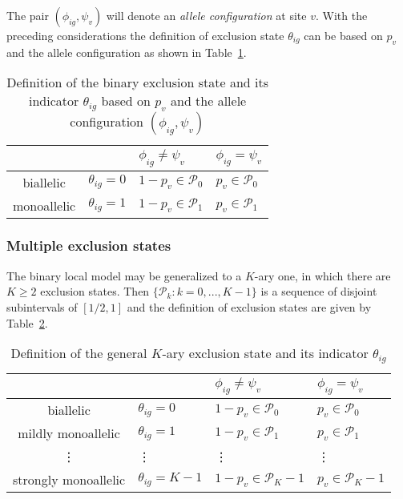 \documentclass[letterpaper]{article}
\begin{document}
The pair \((\phi_{ig},\psi_v)\) will denote an \emph{allele configuration} at
site \(v\).  With the preceding considerations the definition of exclusion
state \(\theta_{ig}\) can be based on \(p_v\) and the allele configuration as
shown in Table~\ref{tab:def-exclusion-state}.
\begin{table}[b]
\begin{center}
\begin{tabular}{cl|ll|}
& & \(\phi_{ig}\neq\psi_v\) & \(\phi_{ig}=\psi_v\) \\
\hline
biallelic & \(\theta_{ig}=0\) & \(1-p_v \in \mathcal{P}_0\) & \(p_v \in \mathcal{P}_0\) \\
monoallelic & \(\theta_{ig}=1\) & \(1-p_v \in \mathcal{P}_1\) & \(p_v \in \mathcal{P}_1\) \\
\hline
\end{tabular}
\caption{
Definition of the binary exclusion state and its indicator \(\theta_{ig}\) based on
\(p_v\) and the allele configuration \((\phi_{ig},\psi_v)\)
}
\label{tab:def-exclusion-state}
\end{center}
\end{table}

\subsubsection{Multiple exclusion states}
\label{sec:local-multinomial}

The binary local model may be generalized to a \(K\)-ary one, in which there
are \(K\ge 2\) exclusion states.  Then \(\{\mathcal{P}_k: k=0,...,K-1\}\) is a
sequence of disjoint subintervals of \([1/2,1]\) and
the definition of exclusion
states are given by Table~\ref{tab:def-exclusion-state-multi}.
\begin{table}[h]
\begin{center}
\begin{tabular}{cl|ll|}
& & \(\phi_{ig}\neq\psi_v\) & \(\phi_{ig}=\psi_v\) \\
\hline
biallelic & \(\theta_{ig}=0\) & \(1-p_v \in \mathcal{P}_0\) & \(p_v \in \mathcal{P}_0\) \\
mildly monoallelic & \(\theta_{ig}=1\) & \(1-p_v \in \mathcal{P}_1\) & \(p_v \in \mathcal{P}_1\) \\
\vdots & \vdots & \vdots & \vdots \\
strongly monoallelic & \(\theta_{ig}=K-1\) & \(1-p_v \in \mathcal{P}_K-1\) & \(p_v \in \mathcal{P}_K-1\) \\
\hline
\end{tabular}
\caption{
Definition of the general \(K\)-ary exclusion state and its indicator \(\theta_{ig}\)
}
\label{tab:def-exclusion-state-multi}
\end{center}
\end{table}
\end{document}
